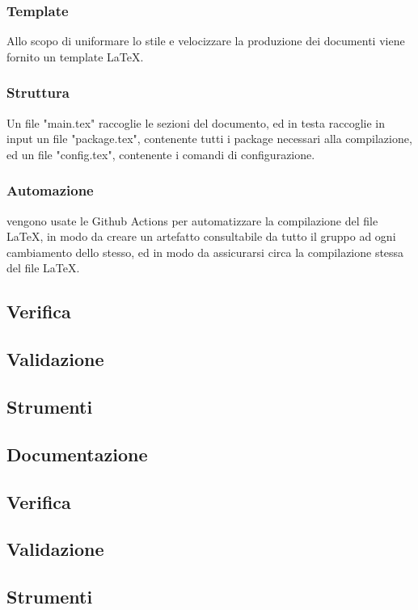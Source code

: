 	    \subsubsection{Template}
	    Allo scopo di uniformare lo stile e velocizzare la produzione dei documenti viene fornito un template LaTeX.
	    \subsubsection{Struttura}
	    Un file "main.tex" raccoglie le sezioni del documento, ed in testa raccoglie in input un file "package.tex", contenente tutti i package necessari alla compilazione, ed un file "config.tex", contenente i comandi di configurazione.
	    \subsubsection{Automazione}
	    vengono usate le Github Actions per automatizzare la compilazione del file LaTeX, in modo da creare un artefatto consultabile da tutto il gruppo ad ogni cambiamento dello stesso, ed in modo  da assicurarsi circa la compilazione stessa del file LaTeX.
	\subsection{Verifica}
	\subsection{Validazione}
	\subsection{Strumenti}
	\subsection{Documentazione}
	\subsection{Verifica}
	\subsection{Validazione}
	\subsection{Strumenti}

